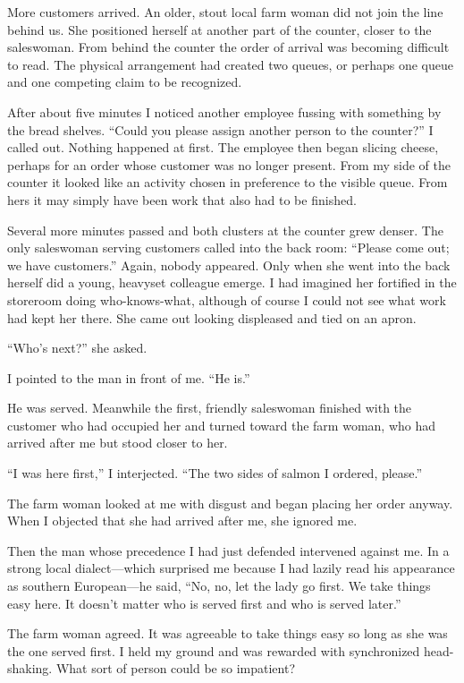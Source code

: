 ﻿\documentclass[12pt,a4paper]{book}
\begin{document}
More customers arrived.  An older, stout local farm woman did not join the line
behind us.  She positioned herself at another part of the counter, closer to
the saleswoman.  From behind the counter the order of arrival was becoming
difficult to read.  The physical arrangement had created two queues, or perhaps
one queue and one competing claim to be recognized.

After about five minutes I noticed another employee fussing with something by
the bread shelves.  ``Could you please assign another person to the counter?''
I called out.  Nothing happened at first.  The employee then began slicing
cheese, perhaps for an order whose customer was no longer present.  From my
side of the counter it looked like an activity chosen in preference to the
visible queue.  From hers it may simply have been work that also had to be
finished.

Several more minutes passed and both clusters at the counter grew denser.  The
only saleswoman serving customers called into the back room: ``Please come out;
we have customers.''  Again, nobody appeared.  Only when she went into the
back herself did a young, heavyset colleague emerge.  I had imagined her
fortified in the storeroom doing who-knows-what, although of course I could not
see what work had kept her there.  She came out looking displeased and tied on
an apron.

``Who's next?'' she asked.

I pointed to the man in front of me.  ``He is.''

He was served.  Meanwhile the first, friendly saleswoman finished with the
customer who had occupied her and turned toward the farm woman, who had arrived
after me but stood closer to her.

``I was here first,'' I interjected.  ``The two sides of salmon I ordered,
please.''

The farm woman looked at me with disgust and began placing her order anyway.
When I objected that she had arrived after me, she ignored me.

Then the man whose precedence I had just defended intervened against me.  In a
strong local dialect---which surprised me because I had lazily read his
appearance as southern European---he said, ``No, no, let the lady go first.
We take things easy here.  It doesn't matter who is served first and who is
served later.''

The farm woman agreed.  It was agreeable to take things easy so long as she was
the one served first.  I held my ground and was rewarded with synchronized
head-shaking.  What sort of person could be so impatient?
\end{document}
